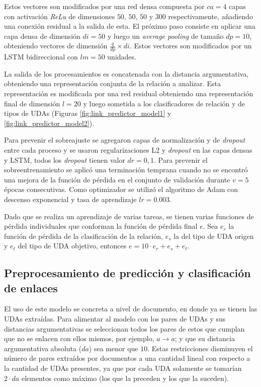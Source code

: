 \documentclass[a4paper,11pt,twocolumn,twoside]{article}
\begin{document}
Estos vectores son modificados por una red densa compuesta por $ca = 4$ capas con activación \textit{ReLu}
de dimensiones $50$, $50$, $50$ y $300$ respectivamente, añadiendo una conexión residual a la salida de esta. 
El próximo paso consiste en aplicar una capa densa de dimensión $di=50$ y luego un \textit{average pooling}
de tamaño $dp=10$, obteniendo vectores de dimensión $\frac{q}{dp} \times di$. 
Estos vectores son modificados por un LSTM bidireccional con $lm=50$ unidades. 

La salida de los procesamientos es concatenada con la distancia argumentativa, obteniendo una representación 
conjunta de la relación a analizar. Esta representación es modificada por una red residual obteniendo
una representación final de dimensión $l=20$ y luego sometida a los clasificadores de relación y de tipos de UDAs
(Figuras \ref{fig:link_predictor_model1} y \ref{fig:link_predictor_model2}).

Para prevenir el sobreajuste se agregaron capas de normalización y de \textit{dropout} entre cada 
proceso y se usaron regularizaciones L2 y \textit{dropout} en las capas densas y LSTM, 
todos los \textit{dropout} tienen valor $dr=0,1$. Para prevenir el sobreentrenamiento se aplicó una 
terminación temprana cuando no se encontró una mejora de la función de pérdida en el 
conjunto de validación durante $v=5$ épocas consecutivas. Como optimizador se utilizó el algoritmo de Adam con descenso 
exponencial y tasa de aprendizaje $lr=0.003$.

Dado que se realiza un aprendizaje de varias tareas, se tienen varias funciones de pérdida individuales que conforman 
la función de pérdida final $e$. Sea $e_r$ la función de pérdida de la clasificación de la relación, $e_s$ la del tipo de UDA origen  
y $e_t$ del tipo de UDA objetivo, entonces $e = 10 \cdot e_r + e_s + e_t$.

\subsection{Preprocesamiento de predicción y clasificación de enlaces}

El uso de este modelo se concreta a nivel de documento, en donde ya se tienen las UDAs extraídas. Para alimentar
al modelo con los pares de UDAs y sus distancias argumentativas se seleccionan todos los pares de estos que cumplan
que no se enlacen con ellos mismos, por ejemplo, $a \rightarrow a$; y que su distancia argumentativa absoluta ($da$) sea menor 
que $10$. Estas restricciones disminuyen el número de pares extraídos por documentos a una cantidad lineal 
con respecto a la cantidad de UDAs presentes, ya que por cada UDA solamente se tomarían $2 \cdot da$ elementos como máximo
(los que la preceden y los que la suceden). 
\end{document}
